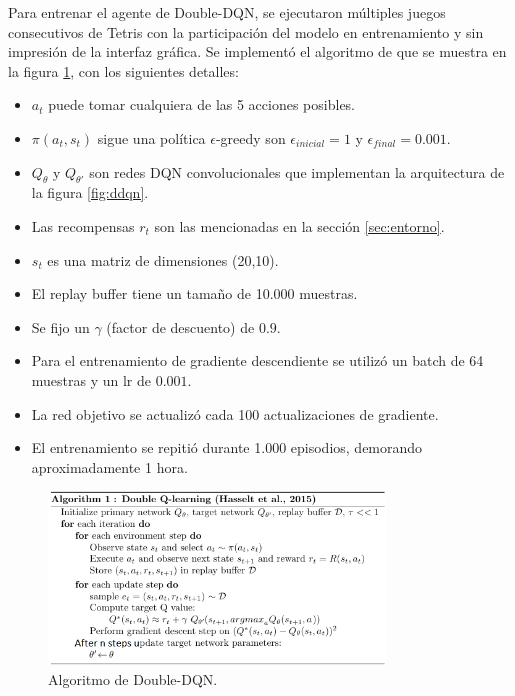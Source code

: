Para entrenar el agente de Double-DQN, se ejecutaron múltiples juegos consecutivos de Tetris con la participación del modelo en entrenamiento y sin impresión de la interfaz gráfica. Se implementó el algoritmo de \citep{ARTICLE:2} que se muestra en la figura \ref{fig:algorithm_ddqn}, con los siguientes detalles:
\begin{itemize}
    \item \(a_t\) puede tomar cualquiera de las 5 acciones posibles.
    \item \(\pi(a_t,s_t)\) sigue una política \(\epsilon\)-greedy son \(\epsilon_{inicial}=1\) y \(\epsilon_{final}=0.001\).
    \item  \(Q_\theta\) y \(Q_{\theta\prime}\) son redes DQN convolucionales que implementan la arquitectura de la figura \ref{fig:ddqn}.
    \item Las recompensas \(r_t\) son las mencionadas en la sección \ref{sec:entorno}.
    \item  \(s_t\) es una matriz de dimensiones (20,10).
    \item El replay buffer tiene un tamaño de 10.000 muestras.
    \item Se fijo un \(\gamma\) (factor de descuento) de \(0.9\). 
    \item Para el entrenamiento de gradiente descendiente se utilizó un batch de 64 muestras y un lr de \(0.001\).
    \item La red objetivo se actualizó cada 100 actualizaciones de gradiente.
    \item El entrenamiento se repitió durante 1.000 episodios, demorando aproximadamente 1 hora.
\end{itemize} 

\begin{figure}[htbp]
	\centering
	\includegraphics[width=0.8\textwidth]{./Figures/algorithm_ddqn.png}
	\caption{Algoritmo de Double-DQN.}
	\label{fig:algorithm_ddqn}
\end{figure}

